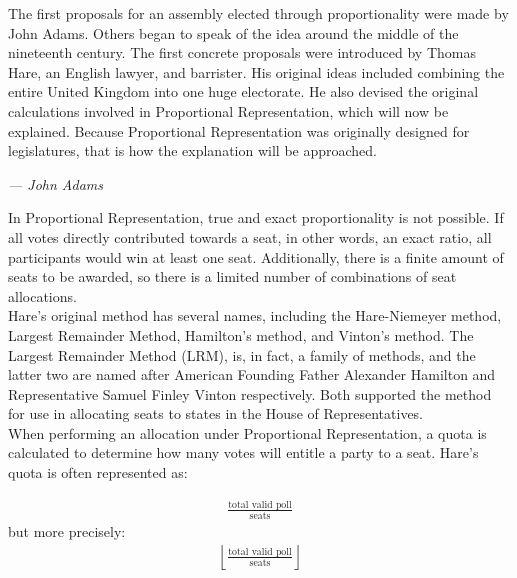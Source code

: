 \documentclass{article}
\begin{document}
    The first proposals for an assembly elected through proportionality were made by John Adams. Others began to speak of the idea around the middle of the nineteenth century. The first concrete proposals were introduced by Thomas Hare, an English lawyer, and barrister. His original ideas included combining the entire United Kingdom into one huge electorate. He also devised the original calculations involved in Proportional Representation, which will now be explained. Because Proportional Representation was originally designed for legislatures, that is how the explanation will be approached. \\

    \begin{flushright}\textit{--- John Adams}\end{flushright}%

    In Proportional Representation, true and exact proportionality is not possible. If all votes directly contributed towards a seat, in other words, an exact ratio, all participants would win at least one seat. Additionally, there is a finite amount of seats to be awarded, so there is a limited number of combinations of seat allocations. \\

    Hare's original method has several names, including the Hare-Niemeyer method, Largest Remainder Method, Hamilton's method, and Vinton's method. The Largest Remainder Method (LRM), is, in fact, a family of methods, and the latter two are named after American Founding Father Alexander Hamilton and Representative Samuel Finley Vinton respectively. Both supported the method for use in allocating seats to states in the House of Representatives. \\

    When performing an allocation under Proportional Representation, a quota is calculated to determine how many votes will entitle a party to a seat. Hare's quota is often represented as:%

    \begin{align}
        \frac{\text{total valid poll}}{\text{seats}}
    \end{align}
    but more precisely:%
    \begin{align}
        \left \lfloor \frac{\text{total valid poll}}{\text{seats}} \right \rfloor
    \end{align}
\end{document}
